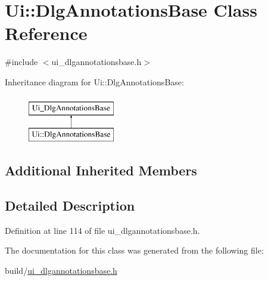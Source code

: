 \hypertarget{classUi_1_1DlgAnnotationsBase}{\section{Ui\+:\+:Dlg\+Annotations\+Base Class Reference}
\label{classUi_1_1DlgAnnotationsBase}
}


{\ttfamily \#include $<$ui\+\_\+dlgannotationsbase.\+h$>$}

Inheritance diagram for Ui\+:\+:Dlg\+Annotations\+Base\+:\begin{figure}[H]
\begin{center}
\leavevmode
\includegraphics[height=2.000000cm]{classUi_1_1DlgAnnotationsBase}
\end{center}
\end{figure}
\subsection*{Additional Inherited Members}


\subsection{Detailed Description}


Definition at line 114 of file ui\+\_\+dlgannotationsbase.\+h.



The documentation for this class was generated from the following file\+:\begin{DoxyCompactItemize}
\item 
build/\hyperlink{ui__dlgannotationsbase_8h}{ui\+\_\+dlgannotationsbase.\+h}\end{DoxyCompactItemize}
